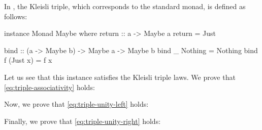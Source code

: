 \begin{example}
  \label{ex:triple-maybe-haskell}

  In \hask, the  Kleisli triple, which corresponds
  to the standard  monad, is defined as follows:
  \begin{codehaskell}
instance Monad Maybe where
  return :: a -> Maybe a
  return = Just

  bind :: (a -> Maybe b) -> Maybe a -> Maybe b
  bind _ Nothing  = Nothing
  bind f (Just x) = f x
  \end{codehaskell}
  Let us see that this instance satisfies the Kleisli triple laws. We
  prove that \eqref{eq:triple-associativity} holds:

  \vspace{1em}
  \begin{steps}
  \end{steps}
  \begin{steps}
  \end{steps}
  Now, we prove that \eqref{eq:triple-unity-left} holds:
  \begin{steps}
  \end{steps}
  Finally, we prove that \eqref{eq:triple-unity-right} holds:

  \vspace{1em}
  \begin{steps}
  \end{steps}
  \begin{steps}
  \end{steps}

\end{example}


